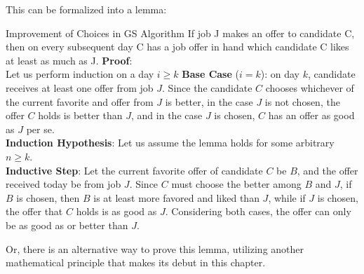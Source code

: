 This can be formalized into a lemma:
\begin{ln-lemma}{Improvement of Choices in GS Algorithm}{}
    If job J makes an offer to candidate C, then on every subsequent day C has a job offer in hand which candidate C likes at least as much as J.
    \tcblower
    \textbf{Proof}: \\
    Let us perform induction on a day $i \geq k$
    \textbf{Base Case} ($i = k$): on day $k$, candidate receives at least one offer from job $J$. Since the candidate $C$ chooses whichever of the current favorite and offer from $J$ is better, in the case $J$ is not chosen, the offer $C$ holds is better than $J$, and in the case $J$ is chosen, $C$ has an offer as good as $J$ per se. \\
    \textbf{Induction Hypothesis}: Let us assume the lemma holds for some arbitrary $n \geq k$. \\
    \textbf{Inductive Step}: Let the current favorite offer of candidate $C$ be $B$, and the offer received today be from job $J$. Since $C$ must choose the better among $B$ and $J$, if $B$ is chosen, then $B$ is at least more favored and liked than $J$, while if $J$ is chosen, the offer that $C$ holds is as good as $J$. Considering both cases, the offer can only be as good as or better than $J$.
\end{ln-lemma}
Or, there is an alternative way to prove this lemma, utilizing another mathematical principle that makes its debut in this chapter.
